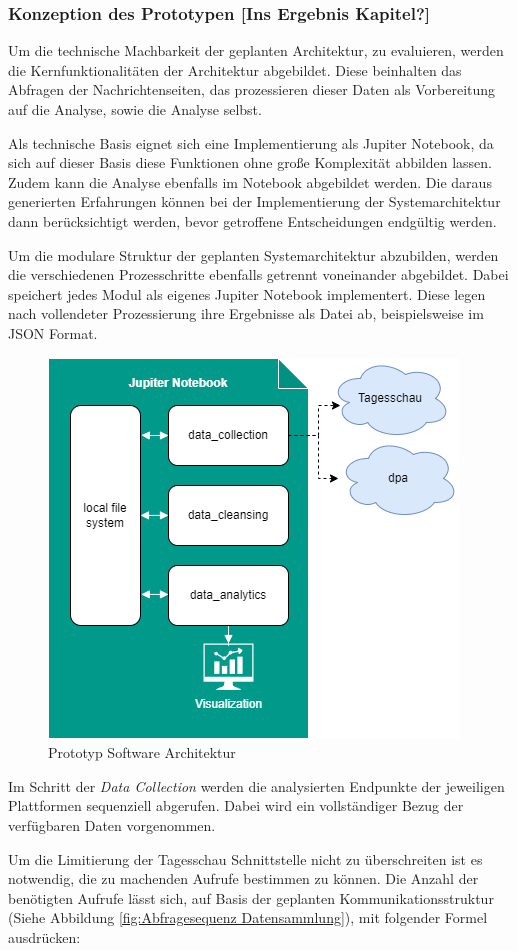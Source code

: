 \subsubsection{Konzeption des Prototypen [Ins Ergebnis Kapitel?]}
Um die technische Machbarkeit der geplanten Architektur, zu evaluieren, werden die Kernfunktionalitäten der Architektur abgebildet. Diese beinhalten das Abfragen der Nachrichtenseiten, das prozessieren dieser Daten als Vorbereitung auf die Analyse, sowie die Analyse selbst. 

Als technische Basis eignet sich eine Implementierung als Jupiter Notebook, da sich auf dieser Basis diese Funktionen ohne große Komplexität abbilden lassen. 
Zudem kann die Analyse ebenfalls im Notebook abgebildet werden.
Die daraus generierten Erfahrungen können bei der Implementierung der Systemarchitektur dann berücksichtigt werden, bevor getroffene Entscheidungen endgültig werden.

Um die modulare Struktur der geplanten Systemarchitektur abzubilden, werden die verschiedenen Prozesschritte ebenfalls getrennt voneinander abgebildet. Dabei speichert jedes Modul als eigenes Jupiter Notebook implementert. Diese legen nach vollendeter Prozessierung ihre Ergebnisse als Datei ab, beispielsweise im JSON Format. 
\begin{figure}[H]
    \centering
    \includegraphics[width=0.5\linewidth]{abbildungen/Prototyp Architecture.drawio.png}
    \caption{Prototyp Software Architektur}
    \label{fig:prototyp-architecture}
\end{figure}
Im Schritt der \textit{Data Collection} werden die analysierten Endpunkte der jeweiligen Plattformen sequenziell abgerufen. Dabei wird ein vollständiger Bezug der verfügbaren Daten vorgenommen. 

Um die Limitierung der Tagesschau Schnittstelle nicht zu überschreiten ist es notwendig, die zu machenden Aufrufe bestimmen zu können. Die Anzahl der benötigten Aufrufe lässt sich, auf Basis der geplanten Kommunikationsstruktur (Siehe Abbildung \ref{fig:Abfragesequenz Datensammlung}), mit folgender Formel ausdrücken:

